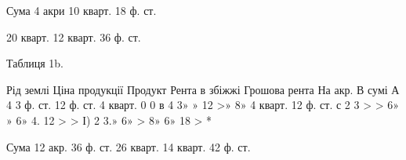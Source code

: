 Сума 4 акри 10 кварт. 18 ф. ст.

20 кварт. 12 кварт. 36 ф. ст.

Таблиця 1b.

Рід  землі    Ціна продукції        Продукт    Рента в збіжжі    Грошова  рента
        На  акр. В сумі
А    4    3 ф. ст.    12 ф. ст.    4 кварт.    0    0
в    4    3» »    12 >» 8» 4 кварт.    12 ф. ст.
с    2    3 > >    6» »    6» 4.    12 > >
І) 2 3.» 6» > 8» 6» 18 > *

Сума 12 акр. 36 ф. ст. 26 кварт. 14 кварт. 42 ф. ст.
\parbreak{}  %
